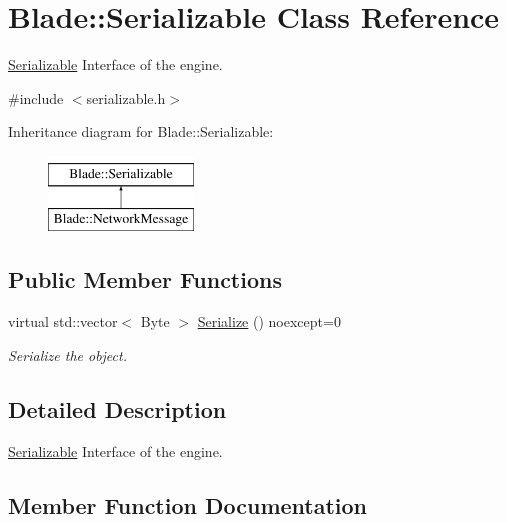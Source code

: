 \hypertarget{class_blade_1_1_serializable}{}\section{Blade\+:\+:Serializable Class Reference}
\label{class_blade_1_1_serializable}


\hyperlink{class_blade_1_1_serializable}{Serializable} Interface of the engine.  




{\ttfamily \#include $<$serializable.\+h$>$}

Inheritance diagram for Blade\+:\+:Serializable\+:\begin{figure}[H]
\begin{center}
\leavevmode
\includegraphics[height=2.000000cm]{class_blade_1_1_serializable}
\end{center}
\end{figure}
\subsection*{Public Member Functions}
\begin{DoxyCompactItemize}
\item 
virtual std\+::vector$<$ Byte $>$ \hyperlink{class_blade_1_1_serializable_a0ae79c24827f91f620f9c267f17f1088}{Serialize} () noexcept=0
\begin{DoxyCompactList}\small\item\em Serialize the object. \end{DoxyCompactList}\end{DoxyCompactItemize}


\subsection{Detailed Description}
\hyperlink{class_blade_1_1_serializable}{Serializable} Interface of the engine. 

\subsection{Member Function Documentation}
\mbox{\label{class_blade_1_1_serializable_a0ae79c24827f91f620f9c267f17f1088}} 
